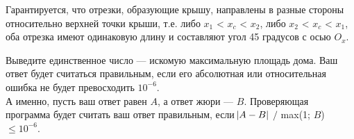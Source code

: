 \begin{problem}
Гарантируется, что отрезки, образующие крышу, направлены в разные стороны относительно верхней точки крыши, т.е. либо $x_1$ < $x_c$ < $x_2$, либо $x_2$ < $x_c$ < $x_1$, оба отрезка имеют одинаковую длину и составляют угол 45 градусов с осью $O_x$.

\OutputFile

Выведите единственное число — искомую максимальную площадь дома. Ваш ответ будет считаться правильным, если его абсолютная или относительная ошибка не будет превосходить $10^{-6}$.\\

А именно, пусть ваш ответ равен $A$, а ответ жюри — $B$. Проверяющая программа будет считать ваш ответ правильным, если $\abs{A-B}$ $/$ max(1; $B$) $\le 10^{-6}$.

\Examples

\begin{example}
%
\end{example}
\end{problem}